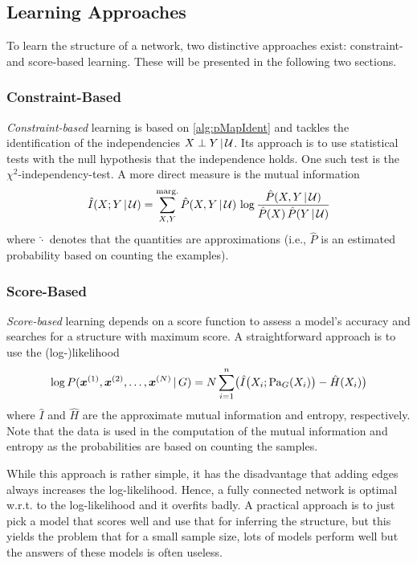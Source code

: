 		\subsection{Learning Approaches}
			To learn the structure of a network, two distinctive approaches exist: constraint- and score-based learning. These will be presented in the following two sections.

			\subsubsection{Constraint-Based}
				\label{subsubsec:constraintBased}

				\emph{Constraint-based} learning is based on \autoref{alg:pMapIdent} and tackles the identification of the independencies \( X \perp Y \,\vert\, \mathcal{U} \). Its approach is to use statistical tests with the null hypothesis that the independence holds. One such test is the \(\chi^2\)-independency-test. A more direct measure is the mutual information
				\begin{equation}
					\hat{I}(X; Y \,\vert\, \mathcal{U}) = \sum_{X, Y}^{\operatorname{marg.}} \hat{P}(X, Y \,\vert\, \mathcal{U}) \, \log\frac{\hat{P}(X, Y \,\vert\, \mathcal{U})}{\hat{P}(X) \, \hat{P}(Y \,\vert\, \mathcal{U})}
				\end{equation}
				where \(\hat{\cdot}\) denotes that the quantities are approximations (i.e., \(\hat{P}\) is an estimated probability based on counting the examples).

			\subsubsection{Score-Based}
				\label{subsubsec:scoreBased}

				\emph{Score-based} learning depends on a score function to assess a model's accuracy and searches for a structure with maximum score. A straightforward approach is to use the (log-)likelihood
				\begin{equation}
					\log P(\bm{x}^{(1)}, \bm{x}^{(2)}, \dots, \bm{x}^{(N)} \,\vert\, G)
						= N \sum_{i = 1}^{n} \bigl( \hat{I}\bigl( X_i; \operatorname{Pa}_G(X_i) \bigr) - \hat{H}(X_i) \bigr)
				\end{equation}
				where \(\hat{I}\) and \(\hat{H}\) are the approximate mutual information and entropy, respectively. Note that the data is used in the computation of the mutual information and entropy as the probabilities are based on counting the samples.

				While this approach is rather simple, it has the disadvantage that adding edges always increases the log-likelihood. Hence, a fully connected network is optimal w.r.t. to the log-likelihood and it overfits badly. A practical approach is to just pick a model that scores well and use that for inferring the structure, but this yields the problem that for a small sample size, lots of models perform well but the answers of these models is often useless.

